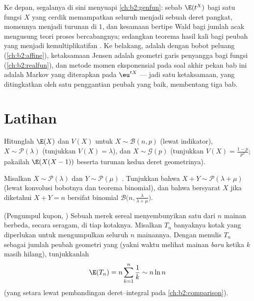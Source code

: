 \begin{remark}
Ke depan, segalanya di sini menyuapi \cref{ch:b2:genfun}: sebab
 $\E(t^X)$ bagi satu fungsi $X$ yang cerdik memampatkan
seluruh  menjadi sebuah deret pangkat, momennya menjadi
turunan di $1$, dan kesamaan bertipe Wald bagi jumlah acak
mengusung teori proses bercabangnya; sedangkan teorema hasil kali bagi
peubah yang  menjadi kemultiplikatifan . Ke belakang,
 adalah  dengan bobot peluang (\cref{ch:b2:affine}),
ketaksamaan Jensen adalah geometri garis penyangga bagi fungsi 
(\cref{ch:b2:realfun}), dan metode momen eksponensial pada
soal akhir pekan bab ini adalah Markov yang diterapkan pada
$\eu^{tX}$ --- jadi satu ketaksamaan, yang ditingkatkan oleh satu penggantian
peubah yang baik, membentang tiga bab.
\end{remark}

\section{Latihan}

\begin{exercise}[$\star$]\label{exo:b2:randomvar:1}
Hitunglah $\E(X)$ dan $V(X)$ untuk $X \sim \mathcal{B}(n, p)$ (lewat
indikator), $X \sim \mathcal{P}(\lambda)$ (tunjukkan $V(X) =
\lambda$), dan $X \sim \mathcal{G}(p)$ (tunjukkan $V(X) =
\frac{1-p}{p^2}$; pakailah $\E(X(X-1))$ beserta turunan kedua
deret geometrinya).
\end{exercise}

\begin{exercise}[$\star$]\label{exo:b2:randomvar:2}
Misalkan $X \sim \mathcal{P}(\lambda)$ dan $Y \sim \mathcal{P}(\mu)$
. Tunjukkan bahwa $X + Y \sim \mathcal{P}(\lambda + \mu)$
(lewat konvolusi bobotnya dan teorema binomial), dan bahwa
 bersyarat $X$ jika diketahui $X + Y = n$ bersifat binomial
$\mathcal{B}\bigl(n, \frac{\lambda}{\lambda + \mu}\bigr)$.
\end{exercise}

\begin{exercise}[$\star$]\label{exo:b2:randomvar:3}
(Pengumpul kupon, ) Sebuah merek sereal menyembunyikan satu dari $n$
mainan berbeda, secara seragam, di tiap kotaknya. Misalkan $T_n$ banyaknya
kotak yang diperlukan untuk mengumpulkan seluruh $n$ mainannya. Dengan menulis $T_n$ sebagai jumlah
peubah geometri yang  (yakni waktu melihat mainan \emph{baru} ketika
$k$ masih hilang), tunjukkanlah
\[
\E(T_n) = n\sum_{k=1}^{n}\frac{1}{k} \sim n\ln n
\]
(yang setara lewat pembandingan deret--integral pada
\cref{ch:b2:comparison}).
\end{exercise}

